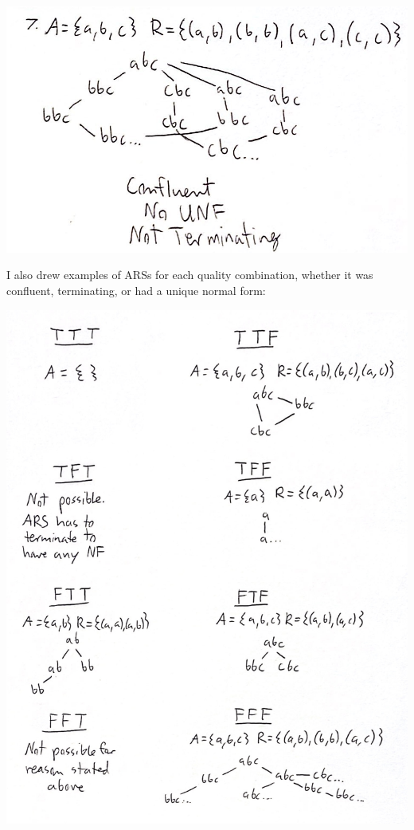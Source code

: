 \documentclass{article}
\theoremstyle{theorem}
\theoremstyle{definition}
\theoremstyle{remark}
\begin{document}
          \begin{center}
            \includegraphics*[scale=0.2]{ars7.jpg}
            \end{center}

  I also drew examples of ARSs for each quality combination, whether it was confluent, terminating, or had a unique normal form: 

  \begin{center}
    \includegraphics*[scale=0.1]{ars-table.jpg}
    \end{center}
\end{document}
